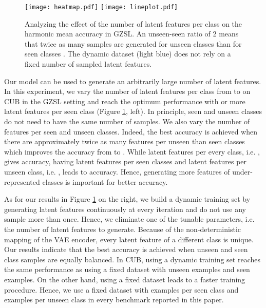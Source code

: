 \documentclass[10pt,twocolumn,letterpaper]{article}
\newcommand{\myparagraph}[1]{\vspace{6pt}\noindent{\bf #1}}
\begin{document}
\begin{figure}[t]
\centering
\texttt{[image: heatmap.pdf]}
\hfill
\texttt{[image: lineplot.pdf]}
\caption{Analyzing the effect of the number of latent features per class on the harmonic mean accuracy in GZSL. An unseen-seen ratio  of 2 means that twice as many samples are generated for unseen classes than for seen classes . The dynamic dataset (light blue) does not rely on a fixed number of sampled latent features.
}
\label{fig:dynamic_dataset}
\end{figure}

\myparagraph{Increasing Number of Latent Features.}
Our model can be used to generate an arbitrarily large number of latent features. In this experiment, we vary the number of latent features per class from  to  on CUB in the GZSL setting and reach the optimum performance with  or more latent features per seen class (Figure \ref{fig:dynamic_dataset}, left). In principle, seen and unseen classes do not need to have the same number of samples.
We also vary the number of features per seen and unseen classes. Indeed, the best accuracy is achieved when there are approximately twice as many features per unseen than seen classes which improves the accuracy from  to . While  latent features per every class, i.e. , gives  accuracy, having  latent features per seen classes and  latent features per unseen class, i.e. , leads to  accuracy. Hence, generating more features of under-represented classes is important for better accuracy.




As for our results in Figure \ref{fig:dynamic_dataset} on the right, we build a dynamic training set by generating latent features continuously at every iteration and do not use any sample more than once. Hence, we eliminate one of the tunable parameters, i.e. the number of latent features to generate. Because of the non-deterministic mapping of the VAE encoder, every latent feature of a different class is unique. Our results indicate that the best accuracy is achieved when unseen and seen class samples are equally balanced. In CUB, using a dynamic training set reaches the same performance as using a fixed dataset with  unseen examples and  seen examples. On the other hand, using a fixed dataset leads to a faster training procedure. Hence, we use a fixed dataset with  examples per seen class and  examples per unseen class in every benchmark reported in this paper.
\end{document}
